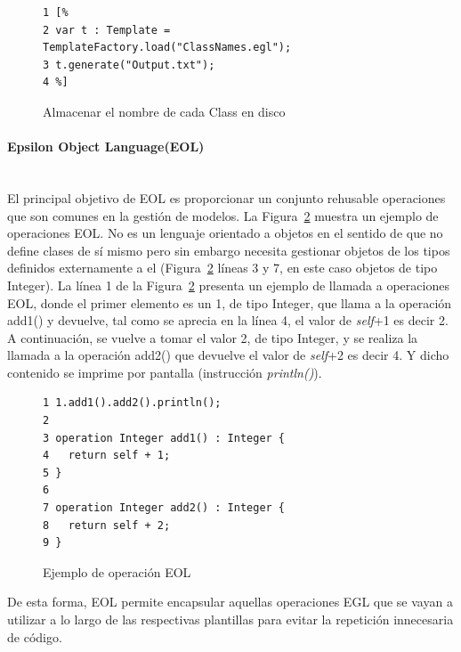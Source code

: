 \begin{figure}[tb!]
\begin{center}
\begin{footnotesize}
\begin{verbatim}
1 [%
2 var t : Template = TemplateFactory.load("ClassNames.egl");
3 t.generate("Output.txt");
4 %]
\end{verbatim}
\end{footnotesize}
\end{center}
\caption{Almacenar el nombre de cada Class en disco}
\label{back:code:template}
\end{figure}


\paragraph{Epsilon Object Language(EOL)} \ \\

El principal objetivo de EOL es proporcionar un conjunto rehusable operaciones que son comunes en la gestión de modelos. La Figura~\ref{back:code:eol} muestra un ejemplo de operaciones EOL. No es un lenguaje orientado a objetos en el sentido de que no define clases de sí mismo pero sin embargo necesita gestionar objetos de los tipos definidos externamente a el (Figura~\ref{back:code:eol} líneas 3 y 7, en este caso objetos de tipo Integer). La línea 1 de la Figura~\ref{back:code:eol} presenta un ejemplo de llamada a operaciones EOL, donde el primer elemento es un 1, de tipo Integer, que llama a la operación add1() y devuelve, tal como se aprecia en la línea 4, el valor de \emph{self}+1 es decir 2. A continuación, se vuelve a tomar el valor 2, de tipo Integer, y se realiza la llamada a la operación add2() que devuelve el valor de \emph{self}+2 es decir 4. Y dicho contenido se imprime por pantalla (instrucción \emph{println()}).

\begin{figure}[tb!]
\begin{center}
\begin{footnotesize}
\begin{verbatim}
1 1.add1().add2().println();
2
3 operation Integer add1() : Integer {
4   return self + 1;
5 }
6
7 operation Integer add2() : Integer {
8   return self + 2;
9 }
\end{verbatim}
\end{footnotesize}
\end{center}
\caption{Ejemplo de operación EOL}
\label{back:code:eol}
\end{figure}

De esta forma, EOL permite encapsular aquellas operaciones EGL que se vayan a utilizar a lo largo de las respectivas plantillas para evitar la repetición innecesaria de código.
